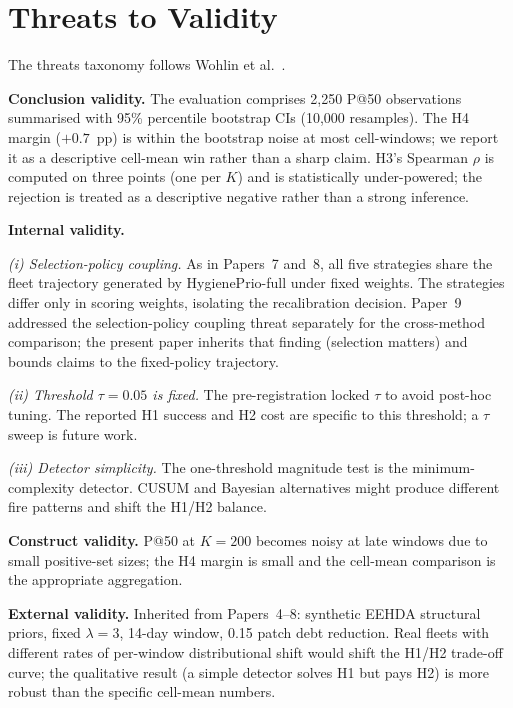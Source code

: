 \section{Threats to Validity}
\label{sec:threats}

The threats taxonomy follows Wohlin et al.~\cite{wohlin2012experimentation}.

\textbf{Conclusion validity.} The evaluation comprises 2{,}250
P@50 observations summarised with 95\% percentile bootstrap
CIs (10{,}000 resamples). The H4 margin ($+0.7$~pp) is within
the bootstrap noise at most cell-windows; we report it as a
descriptive cell-mean win rather than a sharp claim. H3's
Spearman $\rho$ is computed on three points (one per $K$) and
is statistically under-powered; the rejection is treated as a
descriptive negative rather than a strong inference.

\textbf{Internal validity.}

\textit{(i) Selection-policy coupling.} As in Papers~7 and~8, all
five strategies share the fleet trajectory generated by
HygienePrio-full under \textsf{fixed} weights. The strategies
differ only in scoring weights, isolating the recalibration
decision. Paper~9~\cite{paper9selftraj} addressed the
selection-policy coupling threat separately for the cross-method
comparison; the present paper inherits that finding (selection
matters) and bounds claims to the fixed-policy trajectory.

\textit{(ii) Threshold $\tau = 0.05$ is fixed.} The pre-registration
locked $\tau$ to avoid post-hoc tuning. The reported H1 success and
H2 cost are specific to this threshold; a $\tau$ sweep is future work.

\textit{(iii) Detector simplicity.} The one-threshold magnitude test
is the minimum-complexity detector. CUSUM and Bayesian
alternatives might produce different fire patterns and shift the
H1/H2 balance.

\textbf{Construct validity.} P@50 at $K = 200$ becomes noisy at
late windows due to small positive-set sizes; the H4 margin is
small and the cell-mean comparison is the appropriate aggregation.

\textbf{External validity.} Inherited from Papers~4--8: synthetic
EEHDA structural priors, fixed $\lambda = 3$, 14-day window, 0.15
patch debt reduction. Real fleets with different rates of
per-window distributional shift would shift the H1/H2 trade-off
curve; the qualitative result (a simple detector solves H1 but
pays H2) is more robust than the specific cell-mean numbers.
